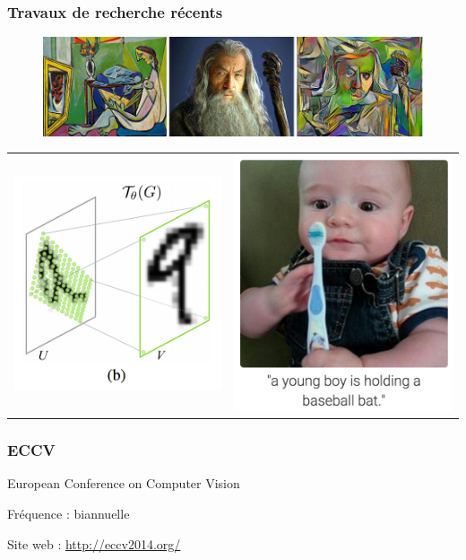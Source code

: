 \documentclass{beamer}
\begin{document}
\begin{frame}
\frametitle{Travaux de recherche récents}

\begin{figure}[H]
 \centering
 \includegraphics[width=0.8\linewidth]{img/artisticnet2.jpg}
\end{figure}

\begin{tabular}{r c}
 \includegraphics[width=0.4\linewidth]{img/spatialtransformernet.png} &
 \includegraphics[width=0.4\linewidth]{img/deepimagesent.png}
\end{tabular}
\end{frame}


\iffalse
\begin{frame}
\frametitle{ECCV}

European Conference on Computer Vision

Fréquence : biannuelle

Site web : \url{http://eccv2014.org/}

\end{frame}
\end{document}

